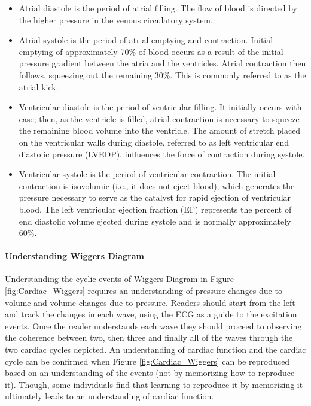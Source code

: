 \begin{itemize}
    \item Atrial diastole is the period of atrial filling. The flow of blood is directed by the higher pressure in the venous circulatory system.
    \item Atrial systole is the period of atrial emptying and contraction. Initial emptying of approximately 70\% of blood occurs as a result of the initial pressure gradient between the atria and the ventricles. Atrial contraction then follows, squeezing out the remaining 30\%. This is commonly referred to as the atrial kick.
    \item Ventricular diastole is the period of ventricular filling. It initially occurs with ease; then, as the ventricle is filled, atrial contraction is necessary to squeeze the remaining blood volume into the ventricle. The amount of stretch placed on the ventricular walls during diastole, referred to as left ventricular end diastolic pressure (LVEDP), influences the force of contraction during systole.
    \item Ventricular systole is the period of ventricular contraction. The initial contraction is isovolumic (i.e., it does not eject blood), which generates the pressure necessary to serve as the catalyst for rapid ejection of ventricular blood. The left ventricular ejection fraction (EF) represents the percent of end diastolic volume ejected during systole and is normally approximately 60\%.
\end{itemize}

\paragraph{Understanding Wiggers Diagram}

Understanding the cyclic events of Wiggers Diagram in Figure \ref{fig:Cardiac_Wiggers} requires an understanding of pressure changes due to volume and volume changes due to pressure. Readers should start from the left and track the changes in each wave, using the ECG as a guide to the excitation events. Once the reader understands each wave they should proceed to observing the coherence between two, then three and finally all of the waves through the two cardiac cycles depicted. An understanding of cardiac function and the cardiac cycle can be confirmed when Figure \ref{fig:Cardiac_Wiggers} can be reproduced based on an understanding of the events (not by memorizing how to reproduce it). Though, some individuals find that learning to reproduce it by memorizing it ultimately leads to an understanding of cardiac function.

